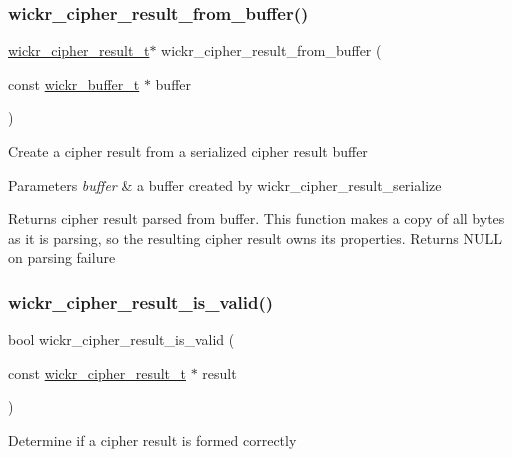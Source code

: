 \subsubsection{\texorpdfstring{wickr\_cipher\_result\_from\_buffer()}{wickr\_cipher\_result\_from\_buffer()}}
{\footnotesize\ttfamily \mbox{\hyperlink{structwickr__cipher__result}{wickr\+\_\+cipher\+\_\+result\+\_\+t}}$\ast$ wickr\+\_\+cipher\+\_\+result\+\_\+from\+\_\+buffer (\begin{DoxyParamCaption}\item[{const \mbox{\hyperlink{structwickr__buffer}{wickr\+\_\+buffer\+\_\+t}} $\ast$}]{buffer }\end{DoxyParamCaption})}

Create a cipher result from a serialized cipher result buffer


\begin{DoxyParams}{Parameters}
{\em buffer} & a buffer created by \textquotesingle{}wickr\+\_\+cipher\+\_\+result\+\_\+serialize\textquotesingle{} \\
\hline
\end{DoxyParams}
\begin{DoxyReturn}{Returns}
cipher result parsed from \textquotesingle{}buffer\textquotesingle{}. This function makes a copy of all bytes as it is parsing, so the resulting cipher result owns its properties. Returns N\+U\+LL on parsing failure 
\end{DoxyReturn}
\mbox{\label{group__wickr__cipher_ga3f1b679c199987148952816b6fc4c009}} 
\subsubsection{\texorpdfstring{wickr\_cipher\_result\_is\_valid()}{wickr\_cipher\_result\_is\_valid()}}
{\footnotesize\ttfamily bool wickr\+\_\+cipher\+\_\+result\+\_\+is\+\_\+valid (\begin{DoxyParamCaption}\item[{const \mbox{\hyperlink{structwickr__cipher__result}{wickr\+\_\+cipher\+\_\+result\+\_\+t}} $\ast$}]{result }\end{DoxyParamCaption})}

Determine if a cipher result is formed correctly


